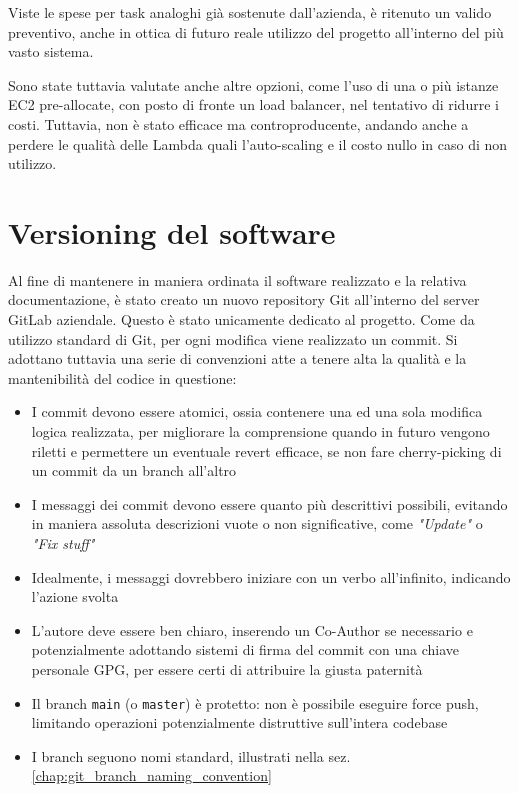 Viste le spese per task analoghi già sostenute dall'azienda, è ritenuto un valido preventivo, anche in ottica di futuro reale utilizzo del progetto all'interno del più vasto sistema.

Sono state tuttavia valutate anche altre opzioni, come l'uso di una o più istanze EC2 pre-allocate, con posto di fronte un load balancer, nel tentativo di ridurre i costi. Tuttavia, non è stato efficace ma controproducente, andando anche a perdere le qualità delle Lambda quali l'auto-scaling e il costo nullo in caso di non utilizzo.

\section{Versioning del software}
Al fine di mantenere in maniera ordinata il software realizzato e la relativa documentazione, è stato creato un nuovo repository Git all'interno del server GitLab aziendale.
Questo è stato unicamente dedicato al progetto.
Come da utilizzo standard di Git, per ogni modifica viene realizzato un commit. Si adottano tuttavia una serie di convenzioni atte a tenere alta la qualità e la mantenibilità del codice in questione:
\begin{itemize}
    \item I commit devono essere atomici, ossia contenere una ed una sola modifica logica realizzata,
    per migliorare la comprensione quando in futuro vengono riletti e permettere un eventuale revert efficace, se non fare cherry-picking di un commit da un branch all'altro
    \item I messaggi dei commit devono essere quanto più descrittivi possibili, evitando in maniera assoluta descrizioni vuote o non significative, come \emph{"Update"} o \emph{"Fix stuff"}
    \item Idealmente, i messaggi dovrebbero iniziare con un verbo all'infinito, indicando l'azione svolta
    \item L'autore deve essere ben chiaro, inserendo un Co-Author se necessario e potenzialmente adottando sistemi di firma del commit con una chiave personale GPG, per essere certi di attribuire la giusta paternità
    \item Il branch \texttt{main} (o \texttt{master}) è protetto: non è possibile eseguire force push, limitando operazioni potenzialmente distruttive sull'intera codebase
    \item I branch seguono nomi standard, illustrati nella sez. \ref{chap:git_branch_naming_convention}
\end{itemize}

